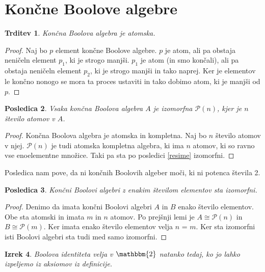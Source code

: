 \documentclass{amsart}
\newtheorem{izrek}{Izrek}[section]
\newtheorem{trditev}[izrek]{Trditev}
\newtheorem{posledica}[izrek]{Posledica}
\begin{document}
\section{Končne Boolove algebre}

\begin{trditev}
    Končna Boolova algebra je atomska.
\end{trditev}

\begin{proof}
    Naj bo \(p\) element končne Boolove algebre. \(p\) je atom, ali pa obstaja 
    neničeln element \(p_1\), ki je strogo manjši. \(p_1\) je atom (in smo končali), ali pa obstaja 
    neničeln element \(p_2\), ki je strogo manjši in tako naprej. Ker je elementov 
    le končno nonogo se mora ta proces ustaviti
    in tako dobimo atom, ki je manjši od \(p\).
\end{proof}

\begin{posledica}
    Vsaka končna Boolova algebra $A$ je izomorfna $\mathcal{P}(n)$, kjer je $n$ število 
    atomov v $A$.
\end{posledica}

\begin{proof}
    Končna Boolova algebra je atomska in kompletna. Naj bo $n$ število atomov v njej.
    $\mathcal{P}(n)$ je tudi atomska kompletna algebra, ki ima $n$ atomov, ki so 
    ravno vse enoelementne množice. Taki pa sta po posledici \ref{resime} izomorfni.
\end{proof}

Posledica nam pove, da ni končnih Boolovih algeber moči, ki ni potenca števila 2.

\begin{posledica}
    Končni Boolovi algebri z enakim številom elementov sta izomorfni.
\end{posledica}

\begin{proof}
    Denimo da imata končni Boolovi algebri $A$ in $B$ enako število elementov.
    Obe sta atomski in imata $m$ in $n$ atomov. Po prejšnji lemi je 
    \(A \cong \mathcal{P}(n)\) in \(B \cong \mathcal{P}(m)\). Ker imata enako
    število elementov velja $n$ = $m$. Ker sta izomorfni isti Boolovi
    algebri sta tudi med samo izomorfni.
\end{proof}

\begin{izrek}
    Boolova identiteta velja v $\mathbbm{2}$ natanko tedaj, 
    ko jo lahko izpeljemo iz aksiomov iz definicije.
\end{izrek}
\end{document}
